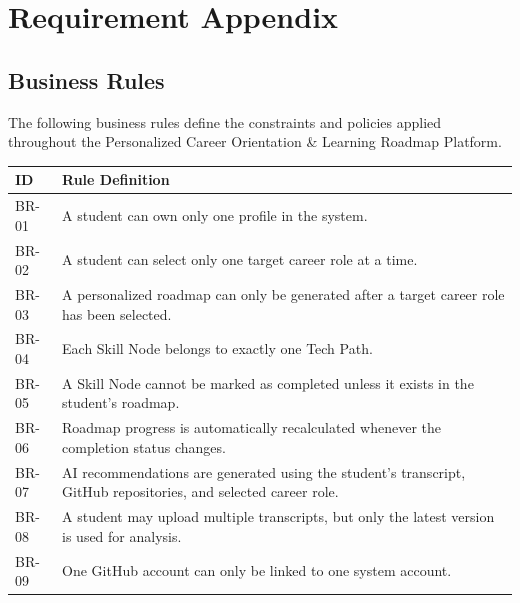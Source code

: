 \chapter{Requirement Appendix}

\section{Business Rules}

The following business rules define the constraints and policies applied throughout the Personalized Career Orientation \& Learning Roadmap Platform.

\renewcommand{\arraystretch}{1.4}    

\begin{longtable}{|>{\centering\arraybackslash}p{1.6cm}|p{12cm}|}
\hline
\rowcolor[HTML]{F4D7D7}
\textbf{ID} & 
\textbf{Rule Definition} 
\\ 
\hline
\endfirsthead

\hline
\endhead

BR-01 &
A student can own only one profile in the system.
\\ \hline

BR-02 &
A student can select only one target career role at a time.
\\ \hline

BR-03 &
A personalized roadmap can only be generated after a target career role has been selected.
\\ \hline

BR-04 &
Each Skill Node belongs to exactly one Tech Path.
\\ \hline

BR-05 &
A Skill Node cannot be marked as completed unless it exists in the student's roadmap.
\\ \hline

BR-06 &
Roadmap progress is automatically recalculated whenever the completion status changes.
\\ \hline

BR-07 &
AI recommendations are generated using the student's transcript, GitHub repositories, and selected career role.
\\ \hline

BR-08 &
A student may upload multiple transcripts, but only the latest version is used for analysis.
\\ \hline

BR-09 &
One GitHub account can only be linked to one system account.
\\ \hline


\end{longtable}
